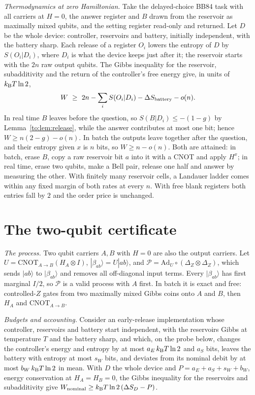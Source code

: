 \emph{Thermodynamics at zero Hamiltonian.} Take the delayed-choice BB84 task with all carriers at $H=0$, the answer register and $B$ drawn from the reservoir as maximally mixed qubits, and the setting register read-only and returned. Let $D$ be the whole device: controller, reservoirs and battery, initially independent, with the battery sharp. Each release of a register $O_i$ lowers the entropy of $D$ by $S(O_i|D_i)$, where $D_i$ is what the device keeps just after it; the reservoir starts with the $2n$ raw output qubits. The Gibbs inequality for the reservoir, subadditivity and the return of the controller's free energy give, in units of $k_{\mathrm B} T\ln2$,
\[
W\ \ge\ 2n-\sum_iS(O_i|D_i)-\Delta S_{\rm battery}-o(n).
\]
In real time $B$ leaves before the question, so $S(B|D_i)\le-(1-g)$ by Lemma~\ref{to:lem:release}, while the answer contributes at most one bit; hence $W\ge n(2-g)-o(n)$. In batch the outputs leave together after the question, and their entropy given $x$ is $n$ bits, so $W\ge n-o(n)$. Both are attained: in batch, erase $B$, copy a raw reservoir bit $a$ into it with a CNOT and apply $H^x$; in real time, erase two qubits, make a Bell pair, release one half and answer by measuring the other. With finitely many reservoir cells, a Landauer ladder comes within any fixed margin of both rates at every $n$. With free blank registers both entries fall by $2$ and the order price is unchanged.

\section{The two-qubit certificate}\label{to:app:certificate}

\emph{The process.} Two qubit carriers $A,B$ with $H=0$ are also the output carriers. Let $U=\mathrm{CNOT}_{A\to B}(H_A\otimes I)$, $|\beta_{ab}\rangle=U|ab\rangle$, and $\mathcal P=\mathrm{Ad}_U\circ(\Delta_Z\otimes\Delta_Z)$, which sends $|ab\rangle$ to $|\beta_{ab}\rangle$ and removes all off-diagonal input terms. Every $|\beta_{ab}\rangle$ has first marginal $I/2$, so $\mathcal P$ is a valid process with $A$ first. In batch it is exact and free: controlled-$Z$ gates from two maximally mixed Gibbs coins onto $A$ and $B$, then $H_A$ and $\mathrm{CNOT}_{A\to B}$.

\emph{Budgets and accounting.} Consider an early-release implementation whose controller, reservoirs and battery start independent, with the reservoirs Gibbs at temperature $T$ and the battery sharp, and which, on the probe below, changes the controller's energy and entropy by at most $a_E\,k_{\mathrm B} T\ln2$ and $a_S$ bits, leaves the battery with entropy at most $s_W$ bits, and deviates from its nominal debit by at most $b_W\,k_{\mathrm B} T\ln2$ in mean. With $D$ the whole device and $P=a_E+a_S+s_W+b_W$, energy conservation at $H_A=H_B=0$, the Gibbs inequality for the reservoirs and subadditivity give $W_{\rm nominal}\ge k_{\mathrm B} T\ln2\,(\Delta S_D-P)$.

